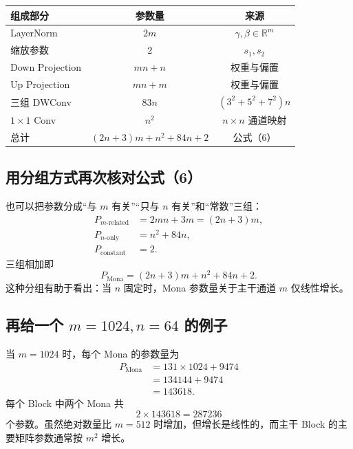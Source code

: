 \documentclass[UTF8,12pt,a4paper,fontset=none]{ctexart}
\newcommand{\R}{\mathbb{R}}
\begin{document}
\begin{center}
\begin{tabular}{lcc}
\toprule
组成部分 & 参数量 & 来源\\
\midrule
LayerNorm & $2m$ & $\gamma,\beta\in\R^m$\\
缩放参数 & $2$ & $s_1,s_2$\\
Down Projection & $mn+n$ & 权重与偏置\\
Up Projection & $mn+m$ & 权重与偏置\\
三组 DWConv & $83n$ & $(3^2+5^2+7^2)n$\\
$1\times1$ Conv & $n^2$ & $n\times n$ 通道映射\\
\midrule
总计 & $(2n+3)m+n^2+84n+2$ & 公式（6）\\
\bottomrule
\end{tabular}
\end{center}



\subsection{用分组方式再次核对公式（6）}

也可以把参数分成“与 $m$ 有关”“只与 $n$ 有关”和“常数”三组：
\begin{align}
 P_{m\text{-related}}
 &=2mn+3m=(2n+3)m,\\
 P_{n\text{-only}}
 &=n^2+84n,\\
 P_{\mathrm{constant}}
 &=2.
\end{align}
三组相加即
\begin{equation}
 P_{\mathrm{Mona}}=(2n+3)m+n^2+84n+2.
\end{equation}
这种分组有助于看出：当 $n$ 固定时，Mona 参数量关于主干通道 $m$ 仅线性增长。

\subsection{再给一个 \texorpdfstring{$m=1024,n=64$}{m=1024, n=64} 的例子}

当 $m=1024$ 时，每个 Mona 的参数量为
\begin{align}
 P_{\mathrm{Mona}}
 &=131\times1024+9474\\
 &=134144+9474\\
 &=143618.
\end{align}
每个 Block 中两个 Mona 共
\begin{equation}
 2\times143618=287236
\end{equation}
个参数。虽然绝对数量比 $m=512$ 时增加，但增长是线性的，而主干 Block 的主要矩阵参数通常按 $m^2$ 增长。
\end{document}
